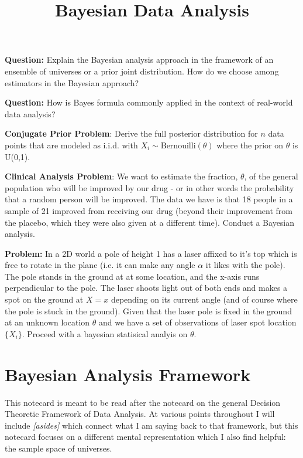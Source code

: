 




\title{Bayesian Data Analysis}
\date{}
\maketitle

\textbf{Question:} Explain the Bayesian analysis approach in the framework of an ensemble of universes or a prior joint distribution. How do we choose among estimators in the Bayesian approach?
\n

\textbf{Question:} How is Bayes formula commonly applied in the context of real-world data analysis?
\n

\textbf{Conjugate Prior Problem}: Derive the full posterior distribution for $n$ data points that are modeled as i.i.d. with $X_i \sim \mathrm{Bernouilli}(\theta)$ where the prior on $\theta$ is U(0,1).
\n

\textbf{Clinical Analysis Problem}: We want to estimate the fraction, $\theta$, of the general population who will be improved by our drug - or in other words the probability that a random person will be improved. The data we have is that 18 people in a sample of 21 improved from receiving our drug (beyond their improvement from the placebo, which they were also given at a different time). Conduct a Bayesian analysis.
\n

\textbf{Problem:} In a 2D world a pole of height 1 has a laser affixed to it's top which is free to rotate in the plane (i.e. it can make any angle $\alpha$ it likes with the pole). The pole stands in the ground at at some location, and the x-axis runs perpendicular to the pole. The laser shoots light out of both ends and makes a spot on the ground at $X=x$ depending on its current angle (and of course where the pole is stuck in the ground). Given that the laser pole is fixed in the ground at an unknown location $\theta$ and we have a set of observations of laser spot location $\{X_i\}$. Proceed with a bayesian statisical analyis on $\theta$. 


\vspace{.3 in}

\tableofcontents

\section{Bayesian Analysis Framework}

This notecard is meant to be read after the notecard on the general Decision Theoretic Framework of Data Analysis. At various points throughout I will include \emph{[asides]} which connect what I am saying back to that  framework, but this notecard focuses on a different mental representation which I also find helpful: the sample space of universes. 
\nn

